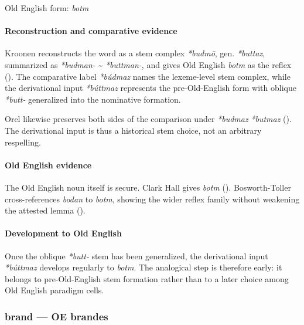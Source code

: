 \documentclass[
  british,
  a4paper,
]{article}
\begin{document}
Old English form: \emph{botm}

\paragraph{Reconstruction and comparative
evidence}\label{reconstruction-and-comparative-evidence-4}

Kroonen reconstructs the word as a stem complex \emph{*budmō}, gen.
\emph{*buttaz}, summarized as \emph{*budman-} \textasciitilde{}
\emph{*buttman-}, and gives Old English \emph{botm} as the reflex
(). The comparative label
\emph{*búdmaz} names the lexeme-level stem complex, while the
derivational input \emph{*búttmaz} represents the pre-Old-English form
with oblique \emph{*butt-} generalized into the nominative formation.

Orel likewise preserves both sides of the comparison under
\emph{*budmaz} \emph{*butmaz} ().
The derivational input is thus a historical stem choice, not an
arbitrary respelling.

\paragraph{Old English evidence}\label{old-english-evidence-4}

The Old English noun itself is secure. Clark Hall gives \emph{botm}
(). Bosworth-Toller
cross-references \emph{bodan} to \emph{botm}, showing the wider reflex
family without weakening the attested lemma
().

\paragraph{Development to Old
English}\label{development-to-old-english-4}

Once the oblique \emph{*butt-} stem has been generalized, the
derivational input \emph{*búttmaz} develops regularly to \emph{botm}.
The analogical step is therefore early: it belongs to pre-Old-English
stem formation rather than to a later choice among Old English paradigm
cells.

\subsubsection{brand --- OE brandes}\label{brand-oe-brandes}
\end{document}
